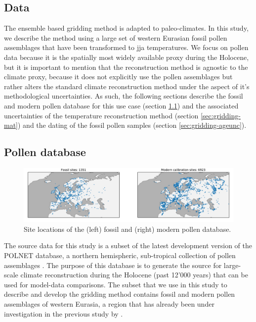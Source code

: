\begin{refsection}
\section{Data}  \label{sec:gridding-data}

The ensemble based gridding method is adapted to paleo-climates. In this study, we describe the method using a large set of western Eurasian fossil pollen assemblages that have been transformed to \gls{jja} temperatures. We focus on pollen data because it is the spatially most widely available proxy during the Holocene, but it is important to mention that the reconstruction method is agnostic to the climate proxy, because it does not explicitly use the pollen assemblages but rather alters the standard climate reconstruction method under the aspect of it's methodological uncertainties. As such, the following sections describe the fossil and modern pollen database for this use case (section \ref{sec:gridding-polnet}) and the associated uncertainties of the temperature reconstruction method (section \ref{sec:gridding-mat}) and the dating of the fossil pollen samples (section \ref{sec:gridding-ageunc}).

\subsection{Pollen database}  \label{sec:gridding-polnet}

\begin{figure}
	\includegraphics[width=\linewidth]{gridding-figures/sitelocs.pdf}
	\caption[Pollen Database]{Site locations of the (left) fossil and (right) modern pollen database.}
	\label{fig:gridding-fossil}
\end{figure}

The source data for this study is a subset of the latest development version of the POLNET database, a northern hemispheric, sub-tropical collection of pollen assemblages \citep{DavisKaplan2017, SommerDavisChevalierEtAl2019}. The purpose of this database is to generate the source for large-scale climate reconstruction during the Holocene (past 12'000 years) that can be used for model-data comparisons. The subset that we use in this study to describe and develop the gridding method contains fossil and modern pollen assemblages of western Eurasia, a region that has already been under investigation in the previous study by \cite{MauriDavisCollinsEtAl2015}. 


\end{refsection}
